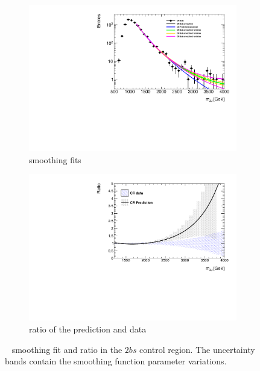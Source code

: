 \begin{figure}[htb!]
\begin{center}
    \captionsetup{justification=centering}
    \hspace{-3cm}
    \begin{subfigure}[b]{0.33\textwidth}
        \includegraphics[width=\textwidth,angle=-90]{figures/boosted/Syst_Shape/QCDSysfitSmooth_22.pdf}
        \caption{smoothing fits}
        \label{fig:qcd_shape_fit_22_fit}
    \end{subfigure}
    \quad \quad \quad \quad \quad
    \begin{subfigure}[b]{0.33\textwidth}
        \includegraphics[width=\textwidth,angle=-90]{figures/boosted/Syst_Shape/QCDSysfitSmooth_ratio_22.pdf}
        \caption{ratio of the prediction and data}
        \label{fig:qcd_shape_fit_22_ratio}
    \end{subfigure}
  \caption{\mtwoJ~ smoothing fit and ratio in the $2bs$ control region. The uncertainty bands contain the smoothing function parameter variations.}
  \label{fig:qcd_shape_fit_22}
\end{center}
\end{figure}



